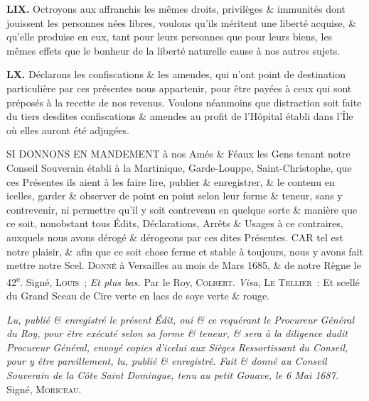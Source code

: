 \documentclass[french,twoside]{book} %
\newif\ifdev
\renewcommand{\LettrineFontHook}{\color{rubric}}
\newcommand{\initialiv}[2]{%
  \let\oldLFH\LettrineFontHook
  \IfSubStr{QJ’}{#1}{
    \lettrine[lines=4, lhang=0.2, loversize=-0.1, lraise=0.2]{\smash{#1}}{#2}
  }{\IfSubStr{É}{#1}{
    \lettrine[lines=4, lhang=0.2, loversize=-0, lraise=0]{\smash{#1}}{#2}
  }{\IfSubStr{ÀÂ}{#1}{
    \lettrine[lines=4, lhang=0.2, loversize=-0, lraise=0, slope=0.6em]{\smash{#1}}{#2}
  }{\IfSubStr{A}{#1}{
    \lettrine[lines=4, lhang=0.2, loversize=0.2, slope=0.6em]{\smash{#1}}{#2}
  }{\IfSubStr{V}{#1}{
    \lettrine[lines=4, lhang=0.2, loversize=0.2, slope=-0.5em]{\smash{#1}}{#2}
  }{
    \lettrine[lines=4, lhang=0.2, loversize=0.2]{\smash{#1}}{#2}
  }}}}}
  \let\LettrineFontHook\oldLFH
}
\newcommand{\labelchar}[1]{\textbf{\color{rubric} #1}}
\renewcommand{\LettrineFontHook}{\bfseries\color{rubric}}
\begin{document}
\labelchar{LIX.} Octroyons aux affranchis les mêmes droits, privilèges \& immunités dont jouissent les personnes nées libres, voulons qu’ils méritent une liberté acquise, \& qu’elle produise en eux, tant pour leurs personnes que pour leurs biens, les mêmes effets que le bonheur de la liberté naturelle cause à nos autres sujets.\par
\labelchar{LX.} Déclarons les confiscations \& les amendes, qui n’ont point de destination particulière par ces présentes nous appartenir, pour être payées à ceux qui sont préposés à la recette de nos revenus. Voulons néanmoins que distraction soit faite du tiers desdites confiscations \& amendes au profit de l’Hôpital établi dans l’Île où elles auront été adjugées.\par
SI DONNONS EN MANDEMENT à nos Amés \& Féaux les Gens tenant notre Conseil Souverain établi à la Martinique, Garde-Louppe, Saint-Christophe, que ces Présentes ils aient à les faire lire, publier \& enregistrer, \& le contenu en icelles, garder \& observer de point en point selon leur forme \& teneur, sans y contrevenir, ni permettre qu’il y soit contrevenu en quelque sorte \& manière que ce soit, nonobstant tous Édits, Déclarations, Arrêts \& Usages à ce contraires, auxquels nous avons dérogé \& dérogeons par ces dites Présentes. CAR tel est notre plaisir, \& afin que ce soit chose ferme et stable à toujours, nous y avons fait mettre notre Scel. {\scshape Donné} à Versailles au mois de Mars 1685, \& de notre Règne le 42\textsuperscript{e}. Signé, {\scshape Louis} ; \emph{Et plus bas.} Par le Roy, {\scshape Colbert}. \emph{Visa}, {\scshape Le Tellier} : Et scellé du Grand Sceau de Cire verte en lacs de soye verte \& rouge.\par
\emph{Lu, publié \& enregistré le présent Édit, oui \& ce requérant le Procureur Général du Roy, pour être exécuté selon sa forme \& teneur, \& sera à la diligence dudit Procureur Général, envoyé copies d’icelui aux Sièges Ressortissant du Conseil, pour y être pareillement, lu, publié \& enregistré. Fait \& donné au Conseil Souverain de la Côte Saint Domingue, tenu au petit Gouave, le 6 Mai 1687.} Signé, {\scshape Moriceau}.
 


\ifbooklet
  \newpage\null\thispagestyle{empty}\newpage
\fi

\ifdev %
\fontname\font — \textsc{Les règles du jeu}\par
(\hyperref[utopie]{\underline{Lien}})\par
\noindent \initialiv{A}{lors là}\blindtext\par
\noindent \initialiv{À}{ la bonheur des dames}\blindtext\par
\noindent \initialiv{É}{tonnez-le}\blindtext\par
\noindent \initialiv{Q}{ualitativement}\blindtext\par
\noindent \initialiv{V}{aloriser}\blindtext\par
\Blindtext
\phantomsection
\label{utopie}
\Blinddocument
\fi
\end{document}
